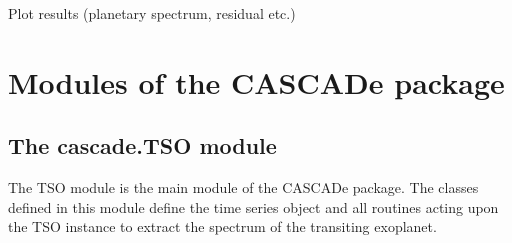 \documentclass[a4paper,11pt,english]{sphinxmanual}
\begin{document}
Plot results (planetary spectrum, residual etc.)

%
\begin{sphinxVerbatim}[commandchars=\\\{\}]
\end{sphinxVerbatim}


\section{Modules of the CASCADe package}
\label{\detokenize{cascade:modules-of-the-cascade-package}}\label{\detokenize{cascade::doc}}

\subsection{The cascade.TSO module}
\label{\detokenize{cascade.TSO:module-cascade.TSO.TSO}}\label{\detokenize{cascade.TSO:the-cascade-tso-module}}\label{\detokenize{cascade.TSO::doc}}
The TSO module is the main module of the CASCADe package.
The classes defined in this module define the time series object and
all routines acting upon the TSO instance to extract the spectrum of the
transiting exoplanet.
\end{document}
